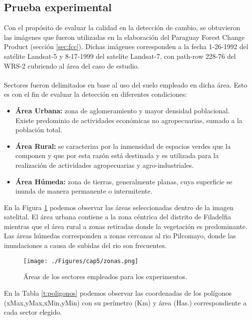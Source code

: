 \subsection{Prueba experimental} 
Con el prop\'osito de evaluar la calidad en la detecci\'on de cambio, se obtuvieron las im\'agenes que fueron utilizadas en la elaboraci\'on del Paraguay Forest Change Product (secci\'on \ref{sec:fcc}). Dichas im\'agenes corresponden a la fecha 1-26-1992	del sat\'elite Landsat-5 y 8-17-1999 del satelite Landsat-7, con path-row 228-76 del WRS-2 cubriendo al \'area del caso de estudio.\\~\\
Sectores fueron delimitados en base al uso del suelo empleado en dicha \'area. Esto es con el fin de evaluar la detecci\'on en diferentes condiciones:
\begin{itemize}
	\item \textbf{\'Area Urbana:} zona de aglomeramiento y mayor densidad poblacional. Existe predominio  de actividades econ\'omicas no agropecuarias, sumado a la poblaci\'on total. 
	\item \textbf{\'Area Rural:} se caracteriza por la inmensidad de espacios verdes que la componen y que por esta raz\'on est\'a destinada y es utilizada para la realizaci\'on de actividades agropecuarias y agro-industriales.
	\item \textbf{\'Area H\'umeda:}	zona de tierras, generalmente planas, cuya superficie se inunda de manera permanente o intermitente.
\end{itemize}
En la Figura \ref{fig:zonasEva} podemos observar las \'areas seleccionadas dentro de la imagen satelital. El \'area urbana contiene a la zona c\'entrica del distrito de Filadelfia mientras que el \'area rural a zonas retiradas donde la vegetaci\'on es predominante. Las \'areas h\'umedas corresponden a zonas cercanas al rio Pilcomayo, donde las inundaciones a causa de subidas del rio son frecuentes.   
\begin{figure}[H]
	\centering
	\texttt{[image: ./Figures/cap5/zonas.png]}
	\caption{\'Areas de los sectores empleados para los experimentos.}
	\label{fig:zonasEva}
\end{figure}
En la Tabla \ref{t:poligonos} podemos observar las coordenadas de los pol\'igonos (xMax,yMax,xMin,yMin) con su per\'imetro (Km) y \'area (Has.) correspondiente a cada sector elegido.
